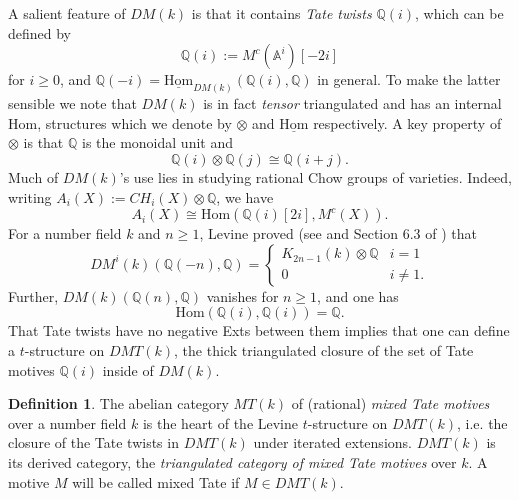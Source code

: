\documentclass[11pt]{amsart}
\theoremstyle{definition}
\newtheorem{defn}[thm]{Definition}
\theoremstyle{remark}
\newcommand{\Hom}{\mathrm{Hom}}
\numberwithin{equation}{section}
\begin{document}
A salient feature of $DM(k)$ is that it contains \textit{Tate twists} $\mathbb{Q}(i)$, which can be defined by \begin{equation}
    \mathbb{Q}(i) := M^c(\mathbb{A}^i)[-2i]
\end{equation} \noindent for $i \geq 0$, and $\mathbb{Q}(-i) = \underline{\Hom}_{DM(k)}(\mathbb{Q}(i), \mathbb{Q})$ in general. To make the latter sensible we note that $DM(k)$ is in fact \textit{tensor} triangulated and has an internal Hom, structures which we denote by $\otimes$ and $\underline{\Hom}$ respectively. A key property of $\otimes$ is that $\mathbb{Q}$ is the monoidal unit and \begin{equation}
    \mathbb{Q}(i) \otimes \mathbb{Q}(j) \cong \mathbb{Q}(i + j).
\end{equation}
Much of $DM(k)$'s use lies in studying rational Chow groups of varieties. Indeed, writing $A_i(X) := CH_i(X) \otimes \mathbb{Q}$, we have \begin{equation}
    A_i(X) \cong \Hom(\mathbb{Q}(i)[2i], M^c(X)).
\end{equation}
For a number field $k$ and $n \geq 1$, Levine proved (see  \cite{levine1998mixed} and Section 6.3 of \cite{dupont2024introduction}) that \begin{equation}\label{MT hereditary}
    DM^i(k)(\mathbb{Q}(-n), \mathbb{Q}) =  \begin{cases} 
      K_{2n-1}(k) \otimes \mathbb{Q} & i = 1 \\
     0 & i \neq 1.
   \end{cases}
\end{equation}
Further, $DM(k)(\mathbb{Q}(n), \mathbb{Q})$ vanishes for $n \geq 1$, and one has \begin{equation}\label{MT}
       \Hom(\mathbb{Q}(i), \mathbb{Q}(i)) = \mathbb{Q}. 
\end{equation}
   That Tate twists have no negative Exts between them implies that one can define a $t$-structure on $DMT(k)$, the thick triangulated closure of the set of Tate motives $\mathbb{Q}(i)$ inside of $DM(k)$.
   
   \begin{defn}
       The abelian category $MT(k)$ of (rational) \textit{mixed Tate motives} over a number field $k$ is the heart of the Levine $t$-structure on $DMT(k)$, i.e. the closure of the Tate twists in $DMT(k)$ under iterated extensions. $DMT(k)$ is its derived category, the \textit{triangulated category of mixed Tate motives} over $k$. A motive $M$ will be called mixed Tate if $M \in DMT(k)$.
   \end{defn}
\end{document}
